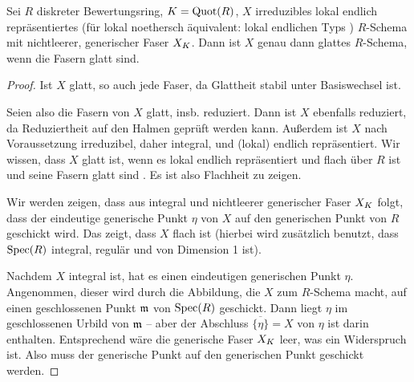 \documentclass[german]{scrreprt}
\begin{document}

\begin{Lemma}\label{thm:glattüberdvr}
  Sei $R$ diskreter Bewertungsring,
  $K=\operatorname{Quot}(R)$,
  $X$ irreduzibles
  lokal endlich repräsentiertes
  (für lokal noethersch äquivalent:
  lokal endlichen Typs \cite[Remark 10.36]{wedhorn})
  $R$-Schema mit nichtleerer, generischer Faser $X_{K}$.
  Dann ist $X$ genau dann glattes $R$-Schema, wenn die Fasern glatt
  sind.
  \begin{proof}
    Ist $X$ glatt, so auch jede Faser, da Glattheit stabil unter
    Basiswechsel ist.

    Seien also die Fasern von $X$ glatt, insb. reduziert.
    Dann ist $X$ ebenfalls reduziert, da Reduziertheit auf den Halmen
    geprüft werden kann.
    Außerdem ist $X$ nach Voraussetzung irreduzibel, daher integral,
    und (lokal) endlich repräsentiert.
    Wir wissen, dass $X$ glatt ist, wenn es lokal endlich repräsentiert
    und flach über $R$ ist und seine Fasern glatt sind
    \cite[8.5, Proposition 17]{bosch}.
    Es ist also Flachheit zu zeigen.
    
    Wir werden zeigen, dass aus integral und nichtleerer generischer
    Faser $X_{K}$ folgt, dass der eindeutige generische Punkt $\eta$
    von $X$ auf den generischen Punkt von $R$ geschickt wird.
    Das zeigt, dass $X$ flach ist
    \cite[Proposition III.9.7]{hartshorne}
    (hierbei wird zusätzlich benutzt, dass $\operatorname{Spec}(R)$ integral,
    regulär und von Dimension 1 ist).

    Nachdem $X$ integral ist, hat es einen eindeutigen generischen
    Punkt $\eta$.
    Angenommen, dieser wird durch die Abbildung, die $X$ zum
    $R$-Schema macht, auf einen geschlossenen Punkt $\mathfrak{m}$ von $\operatorname{Spec}(R)$
    geschickt.
    Dann liegt $\eta$ im geschlossenen Urbild von $\mathfrak{m}$ –
    aber der Abschluss $\overline{\{\eta\}}=X$ von $\eta$ ist darin
    enthalten. Entsprechend wäre die generische Faser $X_{K}$
    leer, was ein Widerspruch ist.
    Also muss der generische Punkt auf den generischen Punkt geschickt
    werden.
  \end{proof}
\end{Lemma}
\end{document}
